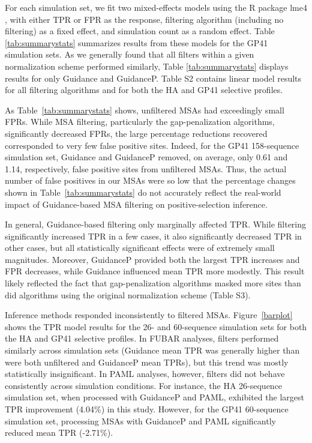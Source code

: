 \documentclass[11pt]{article}
\begin{document}
For each simulation set, we fit two mixed-effects models using the R package lme4 \citep{Bates2012}, with either TPR or FPR as the response, filtering algorithm (including no filtering) as a fixed effect, and simulation count as a random effect. Table \ref{tab:summarystats} summarizes results from these models for the GP41 simulation sets. As we generally found that all filters within a given normalization scheme performed similarly, Table \ref{tab:summarystats} displays results for only Guidance and GuidanceP. Table S2 contains linear model results for all filtering algorithms and for both the HA and GP41 selective profiles.

As Table~\ref{tab:summarystats} shows, unfiltered MSAs had exceedingly small FPRs. While MSA filtering, particularly the gap-penalization algorithms, significantly decreased FPRs, the large percentage reductions recovered corresponded to very few false positive sites. Indeed, for the GP41 158-sequence simulation set, Guidance and GuidanceP removed, on average, only 0.61 and 1.14, respectively, false positive sites from unfiltered MSAs. Thus, the actual number of false positives in our MSAs were so low that the percentage changes shown in Table~\ref{tab:summarystats} do not accurately reflect the real-world impact of Guidance-based MSA filtering on positive-selection inference.

In general, Guidance-based filtering only marginally affected TPR. While filtering significantly increased TPR in a few cases, it also significantly decreased TPR in other cases, but all statistically significant effects were of extremely small magnitudes. Moreover, GuidanceP provided both the largest TPR increases and FPR decreases, while Guidance influenced mean TPR more modestly. This result likely reflected the fact that gap-penalization algorithms masked more sites than did algorithms using the original normalization scheme (Table S3). 

Inference methods responded inconsistently to filtered MSAs. Figure~\ref{barplot} shows the TPR model results for the 26- and 60-sequence simulation sets for both the HA and GP41 selective profiles. In FUBAR analyses, filters performed similarly across simulation sets (Guidance mean TPR was generally higher than were both unfiltered and GuidanceP mean TPRs), but this trend was mostly statistically insignificant. In PAML analyses, however, filters did not behave consistently across simulation conditions. For instance, the HA 26-sequence simulation set, when processed with GuidanceP and PAML, exhibited the largest TPR improvement (4.04\%) in this study. However, for the GP41 60-sequence simulation set, processing MSAs with GuidanceP and PAML significantly reduced mean TPR (-2.71\%).
\end{document}
